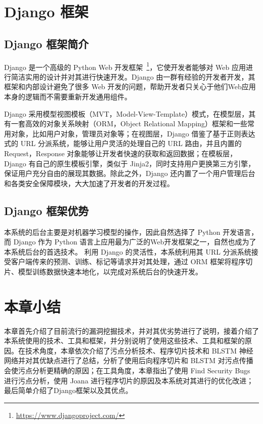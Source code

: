 \section{Django 框架}
\subsection{Django 框架简介}
Django 是一个高级的 Python Web 开发框架~\footnote{\url{https://www.djangoproject.com/}}，它使开发者能够对 Web 应用进行简洁实用的设计并对其进行快速开发。Django 由一群有经验的开发者开发，其框架和内部设计避免了很多 Web 开发的问题，帮助开发者只关心于他们Web应用本身的逻辑而不需要重新开发通用组件。

Django 采用模型视图模板（MVT，Model-View-Template）模式，在模型层，其有一套高效的对象关系映射（ORM，Object Relational Mapping）框架和一些常用对象，比如用户对象，管理员对象等；在视图层，Django 借鉴了基于正则表达式的 URL 分派系统，能够让用户灵活的处理自己的 URL 路由，并且内置的 Request，Response 对象能够让开发者快速的获取和返回数据；在模板层，Django 有自己的原生模板引擎，类似于 Jinja2，同时支持用户更换第三方引擎，保证用户充分自由的展现其数据。除此之外，Django 还内置了一个用户管理后台和各类安全保障模块，大大加速了开发者的开发过程。

\subsection{Django 框架优势}
本系统的后台主要是对机器学习模型的操作，因此自然选择了 Python 开发语言，而 Django 作为 Python 语言上应用最为广泛的Web开发框架之一，自然也成为了本系统后台的首选技术。
利用 Django 的灵活性，本系统利用其 URL 分派系统接受客户端传来的预测、训练、标记等请求并对其处理，通过 ORM 框架将程序切片、模型训练数据快速本地化，以完成对系统后台的快速开发。

\section{本章小结}
本章首先介绍了目前流行的漏洞挖掘技术，并对其优劣势进行了说明，接着介绍了本系统使用的技术、工具和框架，并分别说明了使用这些技术、工具和框架的原因。在技术角度，本章依次介绍了污点分析技术、程序切片技术和 BLSTM 神经网络并对其优缺点进行了总结，分析了使用后向程序切片和 BLSTM 对污点传播会使污点分析更精确的原因；在工具角度，本章指出了使用 Find Security Bugs 进行污点分析，使用 Joana 进行程序切片的原因及本系统对其进行的优化改进；最后简单介绍了Django框架以及其优点。